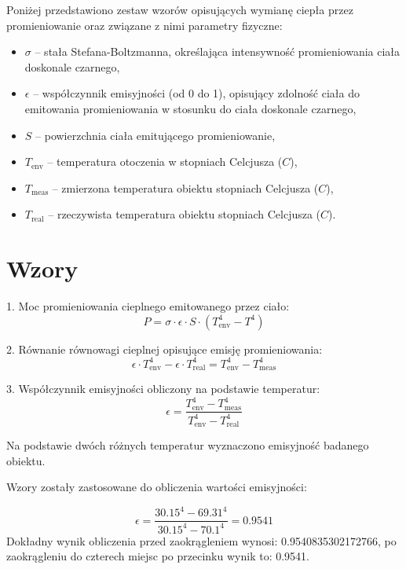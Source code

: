 Poniżej przedstawiono zestaw wzorów opisujących wymianę ciepła przez promieniowanie oraz związane z nimi parametry fizyczne:

\begin{itemize}
    \item \(\sigma\) – stała Stefana-Boltzmanna, określająca intensywność promieniowania ciała doskonale czarnego,
    \item \(\epsilon\) – współczynnik emisyjności (od 0 do 1), opisujący zdolność ciała do emitowania promieniowania w stosunku do ciała doskonale czarnego,
    \item \(S\) – powierzchnia ciała emitującego promieniowanie,
    \item \(T_{\text{env}}\) – temperatura otoczenia w stopniach Celcjusza (\(C\)),
    \item \(T_{\text{meas}}\) – zmierzona temperatura obiektu stopniach Celcjusza (\(C\)),
    \item \(T_{\text{real}}\) – rzeczywista temperatura obiektu stopniach Celcjusza (\(C\)).
\end{itemize}

\newpage

\section{Wzory}
1. Moc promieniowania cieplnego emitowanego przez ciało:
\[
P = \sigma \cdot \epsilon \cdot S \cdot \left( T_{\text{env}}^4 - T^4 \right)
\]

2. Równanie równowagi cieplnej opisujące emisję promieniowania:
\[
\epsilon \cdot T_{\text{env}}^4 - \epsilon \cdot T_{\text{real}}^4 = T_{\text{env}}^4 - T_{\text{meas}}^4
\]

3. Współczynnik emisyjności obliczony na podstawie temperatur:
\[
\epsilon = \frac{T_{\text{env}}^4 - T_{\text{meas}}^4}{T_{\text{env}}^4 - T_{\text{real}}^4}
\]

Na podstawie dwóch różnych temperatur wyznaczono emisyjność badanego obiektu. 

\vspace{12pt}

Wzory zostały zastosowane do obliczenia wartości emisyjności:

\[
\epsilon = \frac{30.15^4 - 69.31^4}{30.15^4 - 70.1^4} = 0.9541
\]
Dokładny wynik obliczenia przed zaokrągleniem wynosi: 0.9540835302172766, po zaokrągleniu do czterech miejsc po przecinku wynik to: 0.9541.